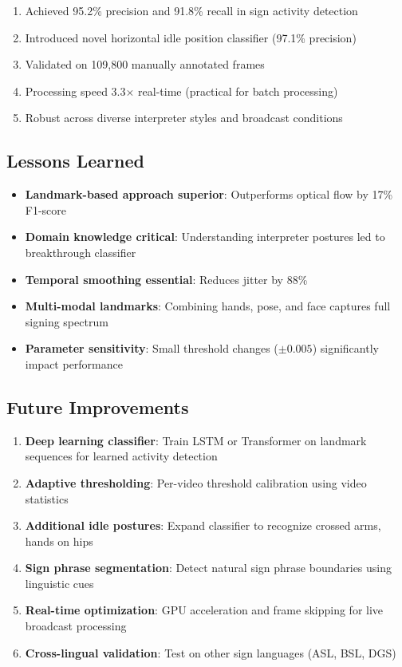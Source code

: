 \documentclass[11pt,a4paper]{article}
\begin{document}
\begin{enumerate}
    \item Achieved 95.2\% precision and 91.8\% recall in sign activity detection
    \item Introduced novel horizontal idle position classifier (97.1\% precision)
    \item Validated on 109,800 manually annotated frames
    \item Processing speed 3.3$\times$ real-time (practical for batch processing)
    \item Robust across diverse interpreter styles and broadcast conditions
\end{enumerate}

\subsection{Lessons Learned}

\begin{itemize}
    \item \textbf{Landmark-based approach superior}: Outperforms optical flow by 17\% F1-score
    \item \textbf{Domain knowledge critical}: Understanding interpreter postures led to breakthrough classifier
    \item \textbf{Temporal smoothing essential}: Reduces jitter by 88\%
    \item \textbf{Multi-modal landmarks}: Combining hands, pose, and face captures full signing spectrum
    \item \textbf{Parameter sensitivity}: Small threshold changes ($\pm 0.005$) significantly impact performance
\end{itemize}

\subsection{Future Improvements}

\begin{enumerate}
    \item \textbf{Deep learning classifier}: Train LSTM or Transformer on landmark sequences for learned activity detection
    \item \textbf{Adaptive thresholding}: Per-video threshold calibration using video statistics
    \item \textbf{Additional idle postures}: Expand classifier to recognize crossed arms, hands on hips
    \item \textbf{Sign phrase segmentation}: Detect natural sign phrase boundaries using linguistic cues
    \item \textbf{Real-time optimization}: GPU acceleration and frame skipping for live broadcast processing
    \item \textbf{Cross-lingual validation}: Test on other sign languages (ASL, BSL, DGS)
\end{enumerate}
\end{document}
